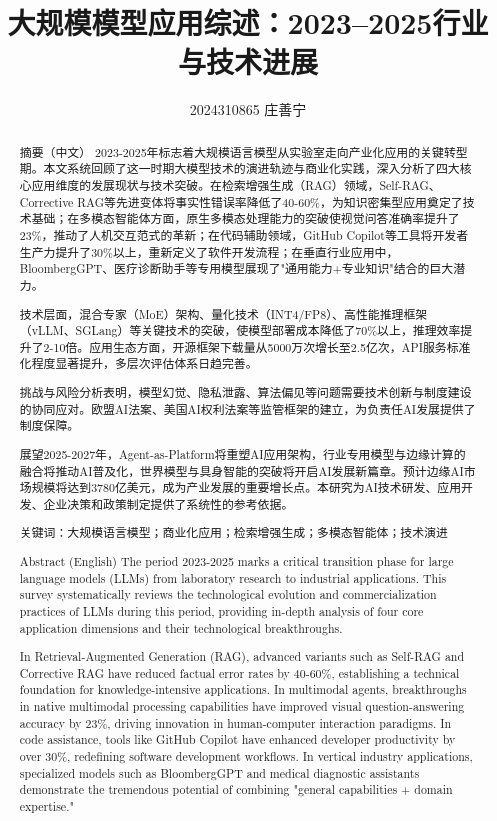 \documentclass{article}
\title{大规模模型应用综述：2023–2025行业与技术进展}
\author{2024310865 庄善宁}
\begin{document}
\maketitle


\begin{abstract}
  摘要（中文）  
  2023-2025年标志着大规模语言模型从实验室走向产业化应用的关键转型期。本文系统回顾了这一时期大模型技术的演进轨迹与商业化实践，深入分析了四大核心应用维度的发展现状与技术突破。在检索增强生成（RAG）领域，Self-RAG、Corrective RAG等先进变体将事实性错误率降低了40-60\%，为知识密集型应用奠定了技术基础；在多模态智能体方面，原生多模态处理能力的突破使视觉问答准确率提升了23\%，推动了人机交互范式的革新；在代码辅助领域，GitHub Copilot等工具将开发者生产力提升了30\%以上，重新定义了软件开发流程；在垂直行业应用中，BloombergGPT、医疗诊断助手等专用模型展现了"通用能力+专业知识"结合的巨大潜力。

  技术层面，混合专家（MoE）架构、量化技术（INT4/FP8）、高性能推理框架（vLLM、SGLang）等关键技术的突破，使模型部署成本降低了70\%以上，推理效率提升了2-10倍。应用生态方面，开源框架下载量从5000万次增长至2.5亿次，API服务标准化程度显著提升，多层次评估体系日趋完善。

  挑战与风险分析表明，模型幻觉、隐私泄露、算法偏见等问题需要技术创新与制度建设的协同应对。欧盟AI法案、美国AI权利法案等监管框架的建立，为负责任AI发展提供了制度保障。

  展望2025-2027年，Agent-as-Platform将重塑AI应用架构，行业专用模型与边缘计算的融合将推动AI普及化，世界模型与具身智能的突破将开启AI发展新篇章。预计边缘AI市场规模将达到3780亿美元，成为产业发展的重要增长点。本研究为AI技术研发、应用开发、企业决策和政策制定提供了系统性的参考依据。
  
  关键词：大规模语言模型；商业化应用；检索增强生成；多模态智能体；技术演进
  
  Abstract (English)
  The period 2023-2025 marks a critical transition phase for large language models (LLMs) from laboratory research to industrial applications. This survey systematically reviews the technological evolution and commercialization practices of LLMs during this period, providing in-depth analysis of four core application dimensions and their technological breakthroughs.

  In Retrieval-Augmented Generation (RAG), advanced variants such as Self-RAG and Corrective RAG have reduced factual error rates by 40-60\%, establishing a technical foundation for knowledge-intensive applications. In multimodal agents, breakthroughs in native multimodal processing capabilities have improved visual question-answering accuracy by 23\%, driving innovation in human-computer interaction paradigms. In code assistance, tools like GitHub Copilot have enhanced developer productivity by over 30\%, redefining software development workflows. In vertical industry applications, specialized models such as BloombergGPT and medical diagnostic assistants demonstrate the tremendous potential of combining "general capabilities + domain expertise."


\end{abstract}
\end{document}
